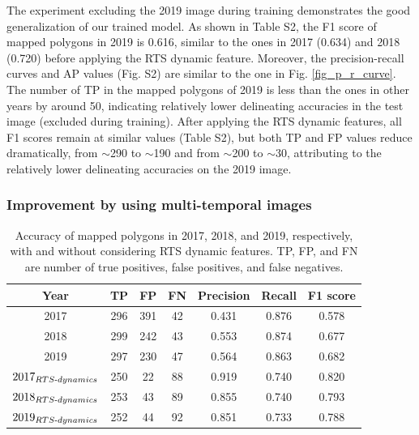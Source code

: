 \documentclass[authoryear,preprint,review,12pt]{elsarticle}
\begin{document}
The experiment excluding the 2019 image during training demonstrates the good generalization of our trained model. 
As shown in Table S2, the F1 score of mapped polygons in 2019 is 0.616, similar to the ones in 2017  (0.634) and 2018 (0.720) before applying the RTS dynamic feature.
Moreover, the precision-recall curves and AP values (Fig. S2) are similar to the one in Fig. \ref{fig_p_r_curve}.
The number of TP in the mapped polygons of 2019 is less than the ones in other years by around 50, indicating relatively lower delineating accuracies in the test image (excluded during training). 
After applying the RTS dynamic features, all F1 scores remain at similar values (Table S2), but both TP and FP values reduce dramatically, from $\sim$290 to $\sim$190 and from $\sim$200 to $\sim$30, attributing to the relatively lower delineating accuracies on the 2019 image.



\subsubsection{Improvement by using multi-temporal images}
\label{sec_improve_using_multi_images}


\begin{table}[ht]
\footnotesize
  \centering
  \caption{Accuracy of mapped polygons in 2017, 2018, and 2019, respectively, with and without considering RTS dynamic features. TP, FP, and FN are number of true positives, false positives, and false negatives.}
    \begin{tabular}{c c c c c c c}
\toprule
    \textbf{Year} & \textbf{TP} & \textbf{FP} & \textbf{FN} & \textbf{Precision} & \textbf{Recall} & \textbf{F1 score} \\
\midrule
   2017 & 296   & 391   & 42    & 0.431 & 0.876 & 0.578 \\
   2018 & 299   & 242   & 43    & 0.553 & 0.874 & 0.677 \\
   2019 & 297   & 230   & 47    & 0.564 & 0.863 & 0.682 \\
   $2017_{RTS{\text -}dynamics}$ & 250   & 22    & 88    & 0.919 & 0.740 & 0.820 \\
   $2018_{RTS{\text -}dynamics}$ & 253   & 43    & 89    & 0.855 & 0.740 & 0.793 \\
   $2019_{RTS{\text -}dynamics}$ & 252   & 44    & 92    & 0.851 & 0.733 & 0.788 \\

\bottomrule
    \end{tabular}
  \label{table_accuracy_f1}
\end{table}
\end{document}
